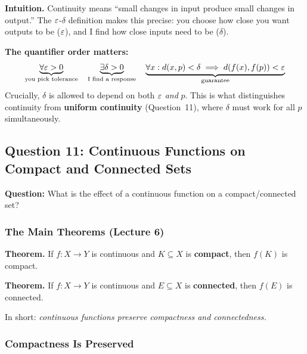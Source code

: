 \documentclass[../master/master.tex]{subfiles}
\begin{document}
\begin{notebox}
\textbf{Intuition.} Continuity means ``small changes in input produce small changes in output.'' The $\varepsilon$-$\delta$ definition makes this precise: you choose how close you want outputs to be ($\varepsilon$), and I find how close inputs need to be ($\delta$).

\textbf{The quantifier order matters:}
\[
\underbrace{\forall \varepsilon > 0}_{\text{you pick tolerance}} \quad \underbrace{\exists \delta > 0}_{\text{I find a response}} \quad \underbrace{\forall x: d(x,p) < \delta \implies d(f(x),f(p)) < \varepsilon}_{\text{guarantee}}
\]
Crucially, $\delta$ is allowed to depend on both $\varepsilon$ \emph{and} $p$. This is what distinguishes continuity from \textbf{uniform continuity} (Question~11), where $\delta$ must work for all $p$ simultaneously.
\end{notebox}

\newpage
\subsection{Question 11: Continuous Functions on Compact and Connected Sets}

\begin{summarybox}
\textbf{Question:} What is the effect of a continuous function on a compact/connected set?
\end{summarybox}

\subsubsection*{The Main Theorems (Lecture 6)}

\textbf{Theorem.} If $f : X \to Y$ is continuous and $K \subseteq X$ is \textbf{compact}, then $f(K)$ is compact.

\textbf{Theorem.} If $f : X \to Y$ is continuous and $E \subseteq X$ is \textbf{connected}, then $f(E)$ is connected.

In short: \emph{continuous functions preserve compactness and connectedness.}

\subsubsection*{Compactness Is Preserved}

\begin{center}
\end{center}
\end{document}

